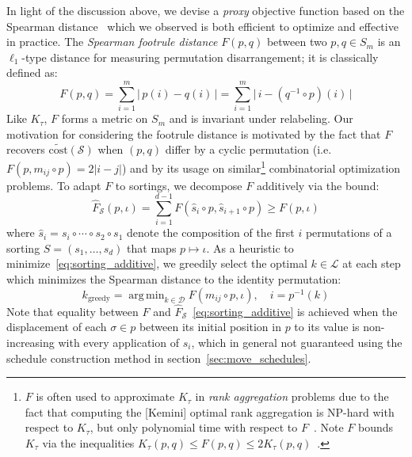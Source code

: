 \documentclass[sn-mathphys]{sn-jnl}
\DeclareMathOperator*{\argmin}{arg\,min}
\begin{document}
In light of the discussion above, we devise a \emph{proxy} objective function based on the Spearman distance~\cite{diaconis1977spearman} which we observed is both efficient to optimize and effective in practice. 
The \emph{Spearman footrule distance} $F(p,q)$ between two $p,q \in S_m$ is an $\ell_1$-type distance for measuring permutation disarrangement; it is classically defined as:
\begin{equation}\label{eq:spearman_dist}
F(p, q) = \sum\limits_{i =1}^m \lvert \, p(i) - q(i) \, \rvert =  \sum\limits_{i =1}^m \lvert \,i - (q^{-1} \circ p)(i) \, \rvert
\end{equation}
Like $K_\tau$, $F$ forms a metric on $S_m$ and is invariant under relabeling.
Our motivation for considering the footrule distance is motivated by the fact that $F$ recovers $\mathrm{\widetilde{cost}}(\mathcal{S})$ when $(p,q)$ differ by a cyclic permutation (i.e. $F(p, m_{ij} \circ p) = 2 \lvert i - j \rvert$) and by its usage on similar\footnote{
$F$ is often used to approximate $K_\tau$ in \emph{rank aggregation} problems due to the fact that computing the [Kemini] optimal rank aggregation is NP-hard with respect to $K_\tau$, but only polynomial time with respect to $F$~\cite{dinu2006efficient}. Note $F$ bounds $K_\tau$ via the inequalities $K_\tau(p, q) \leq F(p, q) \leq 2 K_\tau(p, q)$~\cite{diaconis1977spearman}.
} combinatorial optimization problems. 
To adapt $F$ to sortings, we decompose $F$ additively via the bound:
\begin{equation}\label{eq:sorting_additive}
\hat{F}_{\mathcal{S}}(p, \iota) = \sum\limits_{i=1}^{d-1} F(\hat{s}_i \circ p, \hat{s}_{i+1} \circ p) \geq F(p, \iota)
\end{equation}
where $\hat{s}_i =  s_i \circ \cdots \circ s_2 \circ s_1$ denote the composition of the first $i$ permutations of a sorting  $S = (s_1, \dots, s_d)$ that maps $p \mapsto \iota$.
As a heuristic to minimize~\eqref{eq:sorting_additive}, we greedily select the optimal $k \in \mathcal{L}$ at each step which minimizes the Spearman distance to the identity permutation: 
\begin{equation}\label{eq:greedy_step}
	k_{\text{greedy}} = \argmin_{k \in \mathcal{D}} F(m_{ij} \circ p, \iota), \quad i = p^{-1}(k)
\end{equation}  
Note that equality between $F$ and $\hat{F}_{\mathcal{S}}$~\eqref{eq:sorting_additive} is achieved when the displacement of each $\sigma \in p$ between its initial position in $p$ to its value is non-increasing with every application of $s_i$, which in general not guaranteed using the schedule construction method in section~\ref{sec:move_schedules}. 
\end{document}
